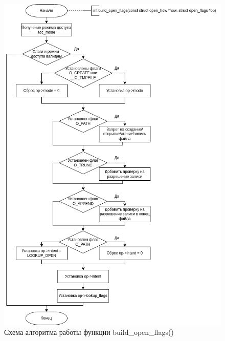 \documentclass[14pt,a4paper]{scrreprt}
\begin{document}
\begin{figure}[H]
	\begin{center}
		\includegraphics[scale=0.7]{assets/build_open_flags.png}
	\end{center}
	\caption{Схема алгоритма работы функции build\_open\_flags()}
\end{figure}
\end{document}
